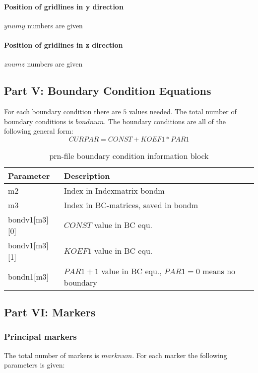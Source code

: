 \paragraph{Position of gridlines in y direction }$ynumy$ numbers are given
\paragraph{Position of gridlines in z direction} $znumz$ numbers are given

\subsection{Part V: Boundary Condition Equations}

For each boundary condition there are $5$ values needed. The total number of boundary conditions is $bondnum$. The boundary conditions are all of the following general form:
$$CURPAR = CONST + KOEF1*PAR1$$

\begin{table}[H]
\small
\centering
\begin{tabular}{l p{9cm}}
\toprule
Parameter & Description\\
\midrule
m2 & Index in Indexmatrix bondm\\ 
m3 & Index in BC-matrices, saved in bondm \\ 
bondv1[m3][0] &  $CONST$ value in BC equ. \\ 
bondv1[m3][1] &  $KOEF1$ value in BC equ. \\ 
bondn1[m3] & $PAR1+1$ value in BC equ., $PAR1=0$ means no boundary \\ 
\bottomrule
\end{tabular}
\caption{prn-file boundary condition information block}
\label{tbl:prn_bond_info}
\end{table}

\subsection{Part VI: Markers}

\subsubsection{Principal markers}
The total number of markers is $marknum$. For each marker the following parameters is given:

